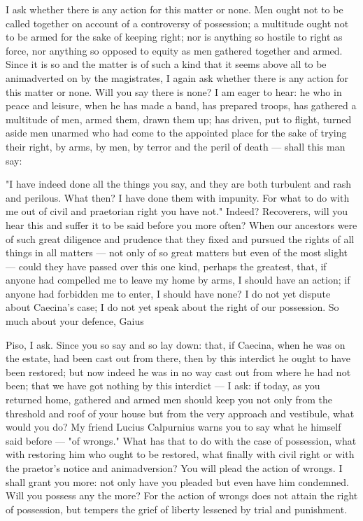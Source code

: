  I ask whether there is any action for this matter or none. Men ought not to be called together on account of a controversy of possession; a multitude ought not to be armed for the sake of keeping right; nor is anything so hostile to right as force, nor anything so opposed to equity as men gathered together and armed. Since it is so and the matter is of such a kind that it seems above all to be animadverted on by the magistrates, I again ask whether there is any action for this matter or none. Will you say there is none? I am eager to hear: he who in peace and leisure, when he has made a band, has prepared troops, has gathered a multitude of men, armed them, drawn them up; has driven, put to flight, turned aside men unarmed who had come to the appointed place for the sake of trying their right, by arms, by men, by terror and the peril of death --- shall this man say:

 "I have indeed done all the things you say, and they are both turbulent and rash and perilous. What then? I have done them with impunity. For what to do with me out of civil and praetorian right you have not." Indeed? Recoverers, will you hear this and suffer it to be said before you more often? When our ancestors were of such great diligence and prudence that they fixed and pursued the rights of all things in all matters --- not only of so great matters but even of the most slight --- could they have passed over this one kind, perhaps the greatest, that, if anyone had compelled me to leave my home by arms, I should have an action; if anyone had forbidden me to enter, I should have none? I do not yet dispute about Caecina's case; I do not yet speak about the right of our possession. So much about your defence, Gaius

 Piso, I ask. Since you so say and so lay down: that, if Caecina, when he was on the estate, had been cast out from there, then by this interdict he ought to have been restored; but now indeed he was in no way cast out from where he had not been; that we have got nothing by this interdict --- I ask: if today, as you returned home, gathered and armed men should keep you not only from the threshold and roof of your house but from the very approach and vestibule, what would you do? My friend Lucius Calpurnius warns you to say what he himself said before --- "of wrongs." What has that to do with the case of possession, what with restoring him who ought to be restored, what finally with civil right or with the praetor's notice and animadversion? You will plead the action of wrongs. I shall grant you more: not only have you pleaded but even have him condemned. Will you possess any the more? For the action of wrongs does not attain the right of possession, but tempers the grief of liberty lessened by trial and punishment.

